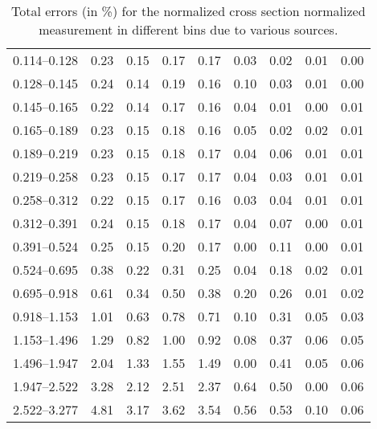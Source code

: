 \begin{table}
\begin{center}
\begin{tabular}{@{}l l l l l l l l l@{}}
            0.114--0.128 & 0.23 & 0.15 & 0.17 & 0.17 & 0.03 & 0.02 & 0.01 & 0.00 \\
            0.128--0.145 & 0.24 & 0.14 & 0.19 & 0.16 & 0.10 & 0.03 & 0.01 & 0.00 \\
            0.145--0.165 & 0.22 & 0.14 & 0.17 & 0.16 & 0.04 & 0.01 & 0.00 & 0.01 \\
            0.165--0.189 & 0.23 & 0.15 & 0.18 & 0.16 & 0.05 & 0.02 & 0.02 & 0.01 \\
            0.189--0.219 & 0.23 & 0.15 & 0.18 & 0.17 & 0.04 & 0.06 & 0.01 & 0.01 \\
            0.219--0.258 & 0.23 & 0.15 & 0.17 & 0.17 & 0.04 & 0.03 & 0.01 & 0.01 \\
            0.258--0.312 & 0.22 & 0.15 & 0.17 & 0.16 & 0.03 & 0.04 & 0.01 & 0.01 \\
            0.312--0.391 & 0.24 & 0.15 & 0.18 & 0.17 & 0.04 & 0.07 & 0.00 & 0.01 \\
            0.391--0.524 & 0.25 & 0.15 & 0.20 & 0.17 & 0.00 & 0.11 & 0.00 & 0.01 \\
            0.524--0.695 & 0.38 & 0.22 & 0.31 & 0.25 & 0.04 & 0.18 & 0.02 & 0.01 \\
            0.695--0.918 & 0.61 & 0.34 & 0.50 & 0.38 & 0.20 & 0.26 & 0.01 & 0.02 \\
            0.918--1.153 & 1.01 & 0.63 & 0.78 & 0.71 & 0.10 & 0.31 & 0.05 & 0.03 \\
            1.153--1.496 & 1.29 & 0.82 & 1.00 & 0.92 & 0.08 & 0.37 & 0.06 & 0.05 \\
            1.496--1.947 & 2.04 & 1.33 & 1.55 & 1.49 & 0.00 & 0.41 & 0.05 & 0.06 \\
            1.947--2.522 & 3.28 & 2.12 & 2.51 & 2.37 & 0.64 & 0.50 & 0.00 & 0.06 \\
            2.522--3.277 & 4.81 & 3.17 & 3.62 & 3.54 & 0.56 & 0.53 & 0.10 & 0.06 \\
            \bottomrule
        \end{tabular}
    \end{center}
    \caption[
        Total errors (in \%) for the normalized cross section normalized
        measurement.
    ]{
        Total errors (in \%) for the normalized cross section normalized
        measurement in different \phistar bins due to various sources.
    }
    \label{tab:sys_uncert_norm}
\end{table}
